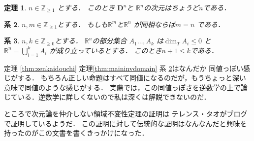 \documentclass[leqno, a4paper, 12pt]{jsarticle}
\newtheorem{thm}{定理}
\newtheorem{cor}[thm]{系}
\newcommand{\zz}{\mathbb{Z}}
\newcommand{\rr}{\mathbb{R}}
\newcommand{\mydisc}[1]{\mathbf{D}^{#1}}
\numberwithin{equation}{section}
\begin{document}
\begin{thm}\label{jigen}
$n\in \zz_{\ge 1}$
とする．
このとき
$\mydisc{n}$と
$\rr^{n}$の次元はちょうど$n$である．
\end{thm}

\begin{cor}\label{cor:mnonaji}
$n, m\in \zz_{\ge 1}$とする．
もしも$\rr^{m}$と$\rr^{n}$
が同相ならば$m=n$
である．
\end{cor}
\begin{cor}
$n, k\in \zz_{\ge 0}$とする．
$\rr^{n}$の部分集合
$A_{1}\dots, A_{k}$
は$\dim_{T} A_{i}\le 0$
と
$\rr^{n}=\bigcup_{i=1}^{k}A_{i}$
が成り立っているとする．
このとき$n+1\le k$である．
\end{cor}


定理
\ref{thm:zenkaidouchi}
定理\ref{thm:maininvdomain}
系 \ref{cor:mnonaji}はなんだか
同値っぽい感じがする．
もちろん正しい命題はすべて同値になるのだが，もうちょっと深い意味で同値のような感じがする．
実際\cite{kihara}では，この同値っぽさを逆数学の上で論じている．逆数学に詳しくないので私は深くは解説できないのだ．


ところで次元論を仲介しない領域不変性定理の証明は
テレンス・タオ\cite{tao}がブログで証明しているようだ．
この証明に対して伝統的な証明はなんなんだと興味を持ったのがこの文書を書くきっかけになった．
\end{document}
